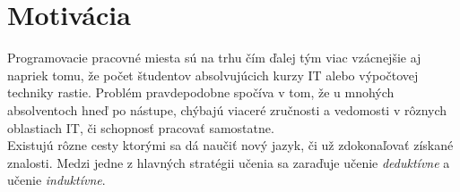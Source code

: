 \documentclass[11pt,a4paper,titlepage]{article}
\begin{document}
\section{Motivácia}
Programovacie pracovné miesta sú na trhu čím ďalej tým viac vzácnejšie aj napriek tomu, že počet študentov absolvujúcich kurzy IT alebo výpočtovej techniky rastie. Problém pravdepodobne spočíva v tom, že u mnohých absolventoch hneď po nástupe, chýbajú viaceré zručnosti a vedomosti v rôznych oblastiach IT, či schopnosť pracovať samostatne. \cite{Motivation:article} \\
Existujú rôzne cesty ktorými sa dá naučiť nový jazyk, či už zdokonaľovať získané znalosti. Medzi jedne z hlavných stratégii učenia sa zaraďuje učenie \textit{deduktívne} a učenie \textit{induktívne}. \cite{Master1:tesis} 
  
\newpage

\renewcommand{\refname}{Referencie}

\end{document}
